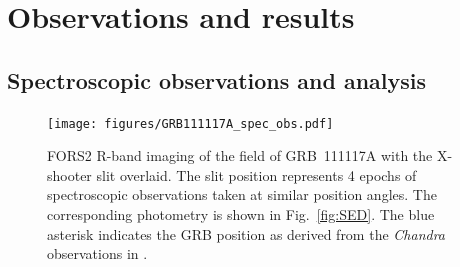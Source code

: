 \documentclass{aa}    %
\begin{document}

\section{Observations and results}

\subsection{Spectroscopic observations and analysis}

\begin{figure}
	\centering
	\texttt{[image: figures/GRB111117A\_spec\_obs.pdf]}
	\caption{
	FORS2 R-band imaging of the field of GRB~111117A with the X-shooter slit overlaid. The slit
	position represents 4 epochs of spectroscopic observations taken at similar
	position angles. The corresponding photometry
	is shown in Fig.~\ref{fig:SED}. The blue asterisk indicates the GRB position as
	derived from the \emph{Chandra} observations in \citet{Sakamoto2013}. 
	}
	\label{fig:spec_setup}
\end{figure}

\end{document}
